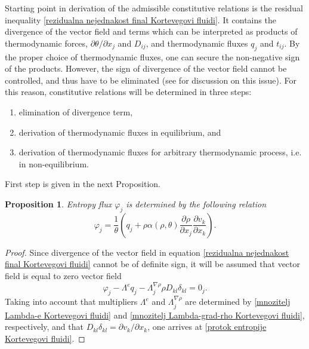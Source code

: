 \documentclass[a4paper,fleqn]{cas-sc}
\newtheorem{proposition}{Proposition}[section]
\theoremstyle{definition}
\begin{document}
Starting point in derivation of the admissible constitutive relations is the residual inequality \eqref{rezidualna nejednakost final Kortevegovi fluidi}. It contains the divergence of the vector field and terms which can be interpreted as products of thermodynamic forces, $\partial \theta/\partial x_{j}$ and $D_{ij}$, and thermodynamic fluxes $q_{j}$ and $t_{ij}$. By the proper choice of thermodynamic fluxes, one can secure the non-negative sign of the products. However, the sign of divergence of the vector field cannot be controlled, and thus have to be eliminated (see \cite{maugin1999thermomechanics} for discussion on this issue). For this reason, constitutive relations will be determined in three steps: 
\begin{enumerate}
	\item elimination of divergence term, 
	\item derivation of thermodynamic fluxes in equilibrium, and
	\item derivation of thermodynamic fluxes for arbitrary thermodynamic process, i.e. in non-equilibrium. 
\end{enumerate}
First step is given in the next Proposition. 

\begin{proposition} \label{Prop:Protok entropije Kortevegovi fluidi}
	Entropy flux $\varphi_{j}$ is determined by the following relation
	\begin{equation}\label{protok entropije Kortevegovi fluidi}
		\varphi_{j} = \dfrac{1}{\theta} \left( q_j + \rho \alpha(\rho,\theta) 
		\dfrac{\partial\rho}{\partial x_j} \dfrac{\partial v_k}{\partial x_k} \right). 
	\end{equation}
\end{proposition} 

\begin{proof}
	Since divergence of the vector field in equation \eqref{rezidualna nejednakost final Kortevegovi fluidi} cannot be of definite sign, it will be assumed that vector field is equal to zero vector field
	\begin{equation*}
		\varphi_j - \Lambda^e q_j - \Lambda^{\nabla\rho}_j\rho D_{kl}\delta_{kl} = 0_{j}. 
	\end{equation*}
	Taking into account that multipliers $\Lambda^{e}$ and $\Lambda^{\nabla\rho}_j$ are determined by \eqref{mnozitelj Lambda-e Kortevegovi fluidi} and \eqref{mnozitelj Lambda-grad-rho Kortevegovi fluidi}, respectively, and that $D_{kl} \delta_{kl} = \partial v_k/\partial x_k$, one arrives at \eqref{protok entropije Kortevegovi fluidi}. 
\end{proof} 
\end{document}
